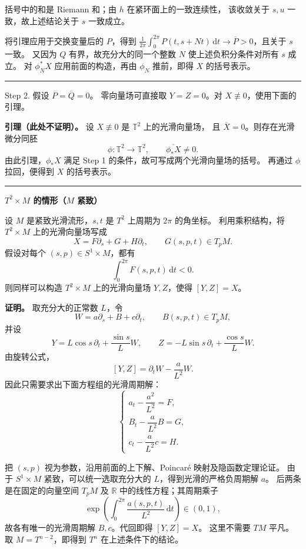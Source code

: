 \documentclass[11pt,a4paper]{ctexart}
\newcommand{\T}{\mathbb T}
\newcommand{\dd}{\,\mathrm d}
\newcommand{\sep}{\par\vspace{5pt}\noindent\rule{\linewidth}{0.7pt}\par\vspace{5pt}}
\newcommand{\red}[1]{{\color{red}#1}}
\begin{document}
括号中的和是 Riemann 和；由 $h$ 在紧环面上的一致连续性，
该收敛关于 $s,u$ 一致，故上述结论关于 $s$ 一致成立。

将引理应用于交换变量后的 $P$，得到
$\frac1{2\pi}\int_0^{2\pi}P(t,s+Nt)\dd t\to\overline P>0$，且关于 $s$ 一致。
又因为 $Q$ 有界，故充分大的同一个整数 $N$ 使上述负积分条件对所有 $s$ 成立。
对 $\phi_N^*X$ 应用前面的构造，再由 $\phi_N$ 推前，即得 $X$ 的括号表示。
\sep
\red{Step 2. 假设 $\overline P=\overline Q=0$。}
零向量场可直接取 $Y=Z=0$。对 $X\not\equiv0$，使用下面的引理。

\textbf{引理（此处不证明）。} 设 $X\not\equiv0$ 是 $\T^2$ 上的光滑向量场，
且 $\overline X=0$。则存在光滑微分同胚
\[\phi:\T^2\to\T^2,\qquad \overline{\phi_*X}\ne0.\]
由此引理，$\phi_*X$ 满足 Step 1 的条件，故可写成两个光滑向量场的括号。
再通过 $\phi$ 拉回，便得到 $X$ 的括号表示。
\clearpage
\sep
\textbf{$T^2\times M$ 的情形（$M$ 紧致）}

设 $M$ 是紧致光滑流形，$s,t$ 是 $T^2$ 上周期为 $2\pi$ 的角坐标。
利用乘积结构，将 $T^2\times M$ 上的光滑向量场写成
\[X=F\partial_s+G+H\partial_t,\qquad G(s,p,t)\in T_pM.\]
假设对每个 $(s,p)\in S^1\times M$，都有
\[\int_0^{2\pi}F(s,p,t)\dd t<0.\]
则同样可以构造 $T^2\times M$ 上的光滑向量场 $Y,Z$，使得 $[Y,Z]=X$。

\textbf{证明。} 取充分大的正常数 $L$，令
\[W=a\partial_s+B+c\partial_t,\qquad B(s,p,t)\in T_pM,\]
并设
\[
Y=L\cos s\,\partial_t+\frac{\sin s}{L}W,
\qquad
Z=-L\sin s\,\partial_t+\frac{\cos s}{L}W.
\]
由旋转公式，
\[[Y,Z]=\partial_tW-\frac{a}{L^2}W.\]
因此只需要求出下面方程组的光滑周期解：
\[
\begin{cases}
a_t-\dfrac{a^2}{L^2}=F,\\[6pt]
B_t-\dfrac{a}{L^2}B=G,\\[6pt]
c_t-\dfrac{a}{L^2}c=H.
\end{cases}
\]

把 $(s,p)$ 视为参数，沿用前面的上下解、Poincar\'e 映射及隐函数定理论证。
由于 $S^1\times M$ 紧致，可以统一选取充分大的 $L$，得到光滑的严格负周期解 $a$。
后两条是在固定的向量空间 $T_pM$ 及 $\mathbb R$ 中的线性方程；其周期乘子
\[\exp\!\left(\int_0^{2\pi}\frac{a(s,p,t)}{L^2}\dd t\right)\in(0,1),\]
故各有唯一的光滑周期解 $B,c$。代回即得 $[Y,Z]=X$。
这里不需要 $TM$ 平凡。取 $M=T^{n-2}$，即得到 $T^n$ 在上述条件下的结论。
\end{document}
